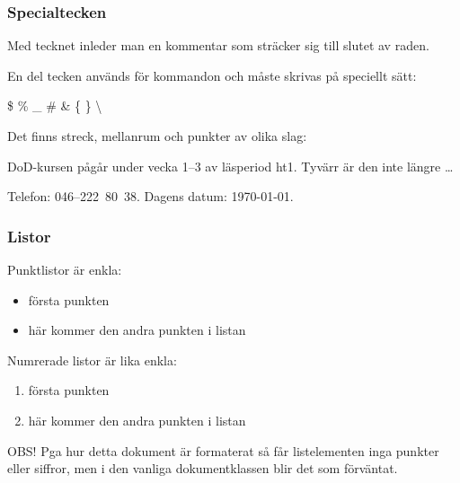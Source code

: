 \begin{frame}[fragile=singleslide]
\frametitle{Specialtecken}
Med tecknet \code{\%} inleder man en kommentar som sträcker sig till slutet av raden.

\blankline
En del tecken används för kommandon och måste skrivas på speciellt sätt:

\begin{Code}
\$ \% \_ \# \& \{ \} \textbackslash
\end{Code}

Det finns streck, mellanrum och punkter av olika slag:

\begin{exempel}
DoD-kursen pågår under vecka
1--3 av läsperiod ht1. Tyvärr 
är den inte längre \ldots

\quad Telefon: 046--222~80~38.
Dagens datum: \today.
\end{exempel}
\end{frame} 


\begin{frame}[fragile=singleslide]
\frametitle{Listor}
Punktlistor är enkla:

\begin{exempel}
\begin{itemize}
  \item första punkten
  \item här kommer den andra 
  punkten i listan
\end{itemize}
\end{exempel}

Numrerade listor är lika enkla:

\begin{exempel}
\begin{enumerate}
  \item första punkten
  \item här kommer den andra
  punkten i listan
\end{enumerate}
\end{exempel}

OBS! Pga hur detta dokument är formaterat så får listelementen inga punkter eller siffror, men i den vanliga dokumentklassen  blir det som förväntat.
\end{frame} 

